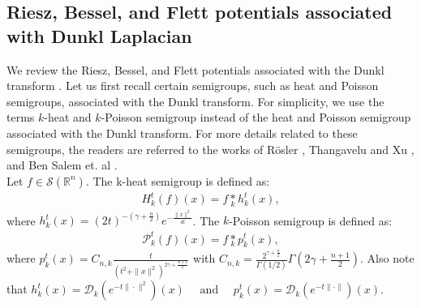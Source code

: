 \documentclass[11pt,a4paper,reqno]{amsproc}
\theoremstyle{definition}
\theoremstyle{remark}
\numberwithin{equation}{section}
\begin{document}
\subsection{Riesz, Bessel, and Flett potentials associated with Dunkl Laplacian}
We review the Riesz, Bessel, and Flett potentials associated with the Dunkl transform \cite{Xu, Ben}. Let us first recall certain semigroups, such as heat and Poisson semigroups, associated with the Dunkl transform. For simplicity, we use the terms $k$-heat and $k$-Poisson semigroup instead of the heat and Poisson semigroup associated with the Dunkl transform. For more details related to these semigroups, the readers are referred to the works of R\"osler \cite{Rosler-98}, Thangavelu and Xu \cite{Thangavelu}, and Ben Salem et. al \cite{Ben}.\\ Let $f\in \mathcal{S}(\mathbb{R}^n)$. The k-heat semigroup is defined as:
\begin{align*}
    H_k^t(f)(x)= f\underset{k}{\ast} h_k^t (x),
\end{align*}where $h_k^t(x)= (2t)^{-(\gamma+\frac{n}{2})}e^{-\frac{\|x\|^2}{4t}}$.  The $k$-Poisson semigroup is defined as:
\begin{align*}
    \mathcal{P}_k^t(f)(x) = f\underset{k}{\ast} p_k^t (x),
\end{align*} where $p_k^t(x) = C_{n,k} \frac{t}{(t^2+\|x\|^2)^{2\gamma+\frac{n+1}{2}}}$ with  $C_{n,k}= \frac{2^{\gamma+\frac{n}{2}}}{\Gamma(1/2)} \Gamma(2\gamma+\frac{n+1}{2}).$ Also note that $ h_k^t(x)= \mathcal{D}_k\left( e^{-t\|\cdot\|^2} \right)(x) \quad \text{ and } \quad p_k^t(x)= \mathcal{D}_k \left(e^{-t\|\cdot\|}\right)(x). $
\\
\end{document}

